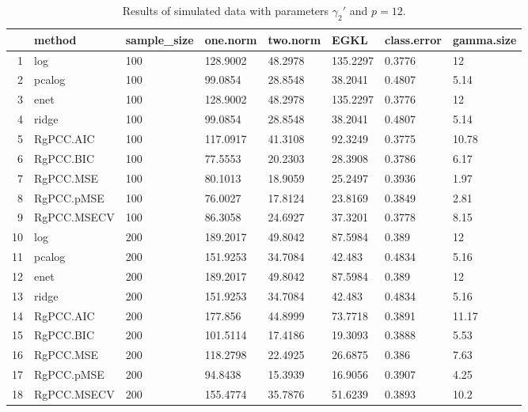 \begin{table}[ht]
\centering
\begin{tabular}{rlllllll}
  \hline
 & method & sample\_size & one.norm & two.norm & EGKL & class.error & gamma.size \\ 
  \hline
1 & log & 100 & 128.9002 & 48.2978 & 135.2297 & 0.3776 & 12 \\ 
  2 & pcalog & 100 & 99.0854 & 28.8548 & 38.2041 & 0.4807 & 5.14 \\ 
  3 & enet & 100 & 128.9002 & 48.2978 & 135.2297 & 0.3776 & 12 \\ 
  4 & ridge & 100 & 99.0854 & 28.8548 & 38.2041 & 0.4807 & 5.14 \\ 
  5 & RgPCC.AIC & 100 & 117.0917 & 41.3108 & 92.3249 & 0.3775 & 10.78 \\ 
  6 & RgPCC.BIC & 100 & 77.5553 & 20.2303 & 28.3908 & 0.3786 & 6.17 \\ 
  7 & RgPCC.MSE & 100 & 80.1013 & 18.9059 & 25.2497 & 0.3936 & 1.97 \\ 
  8 & RgPCC.pMSE & 100 & 76.0027 & 17.8124 & 23.8169 & 0.3849 & 2.81 \\ 
  9 & RgPCC.MSECV & 100 & 86.3058 & 24.6927 & 37.3201 & 0.3778 & 8.15 \\ 
  10 & log & 200 & 189.2017 & 49.8042 & 87.5984 & 0.389 & 12 \\ 
  11 & pcalog & 200 & 151.9253 & 34.7084 & 42.483 & 0.4834 & 5.16 \\ 
  12 & enet & 200 & 189.2017 & 49.8042 & 87.5984 & 0.389 & 12 \\ 
  13 & ridge & 200 & 151.9253 & 34.7084 & 42.483 & 0.4834 & 5.16 \\ 
  14 & RgPCC.AIC & 200 & 177.856 & 44.8999 & 73.7718 & 0.3891 & 11.17 \\ 
  15 & RgPCC.BIC & 200 & 101.5114 & 17.4186 & 19.3093 & 0.3888 & 5.53 \\ 
  16 & RgPCC.MSE & 200 & 118.2798 & 22.4925 & 26.6875 & 0.386 & 7.63 \\ 
  17 & RgPCC.pMSE & 200 & 94.8438 & 15.3939 & 16.9056 & 0.3907 & 4.25 \\ 
  18 & RgPCC.MSECV & 200 & 155.4774 & 35.7876 & 51.6239 & 0.3893 & 10.2 \\ 
   \hline
\end{tabular}
\caption{Results of simulated data with parameters $\gamma_2'$ and $p =12$. } 
\label{fig-2'-nonlead-12-metrics-p}
\end{table}
